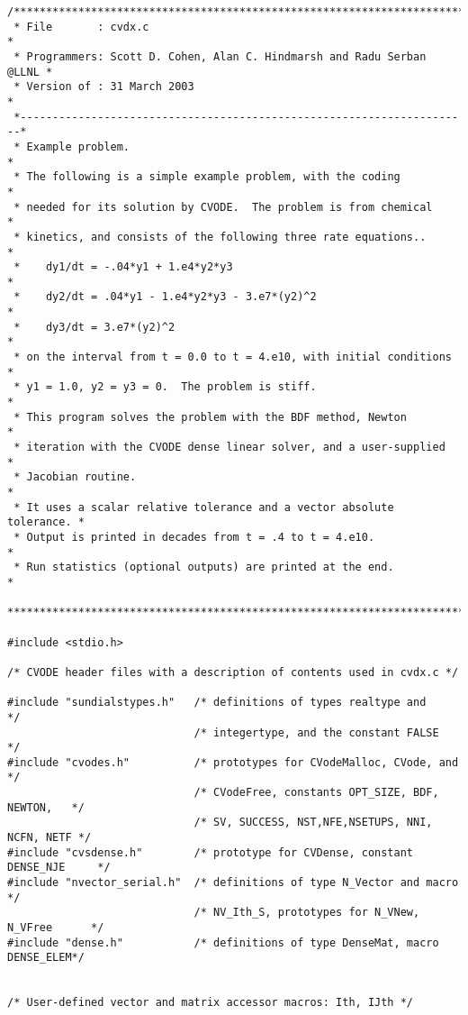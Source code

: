 \begin{verbatim}
/************************************************************************
 * File       : cvdx.c                                                  *
 * Programmers: Scott D. Cohen, Alan C. Hindmarsh and Radu Serban @LLNL *
 * Version of : 31 March 2003                                           *
 *----------------------------------------------------------------------*
 * Example problem.                                                     *
 * The following is a simple example problem, with the coding           *
 * needed for its solution by CVODE.  The problem is from chemical      *
 * kinetics, and consists of the following three rate equations..       *
 *    dy1/dt = -.04*y1 + 1.e4*y2*y3                                     *
 *    dy2/dt = .04*y1 - 1.e4*y2*y3 - 3.e7*(y2)^2                        *
 *    dy3/dt = 3.e7*(y2)^2                                              *
 * on the interval from t = 0.0 to t = 4.e10, with initial conditions   *
 * y1 = 1.0, y2 = y3 = 0.  The problem is stiff.                        *
 * This program solves the problem with the BDF method, Newton          *
 * iteration with the CVODE dense linear solver, and a user-supplied    *
 * Jacobian routine.                                                    * 
 * It uses a scalar relative tolerance and a vector absolute tolerance. *
 * Output is printed in decades from t = .4 to t = 4.e10.               *
 * Run statistics (optional outputs) are printed at the end.            *
 ************************************************************************/

#include <stdio.h>

/* CVODE header files with a description of contents used in cvdx.c */

#include "sundialstypes.h"   /* definitions of types realtype and             */
                             /* integertype, and the constant FALSE           */
#include "cvodes.h"          /* prototypes for CVodeMalloc, CVode, and        */
                             /* CVodeFree, constants OPT_SIZE, BDF, NEWTON,   */
                             /* SV, SUCCESS, NST,NFE,NSETUPS, NNI, NCFN, NETF */
#include "cvsdense.h"        /* prototype for CVDense, constant DENSE_NJE     */
#include "nvector_serial.h"  /* definitions of type N_Vector and macro        */
                             /* NV_Ith_S, prototypes for N_VNew, N_VFree      */
#include "dense.h"           /* definitions of type DenseMat, macro DENSE_ELEM*/


/* User-defined vector and matrix accessor macros: Ith, IJth */


\end{verbatim}

